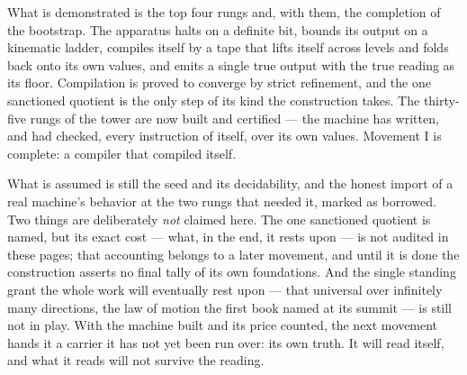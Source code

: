 What is demonstrated is the top four rungs and, with them, the completion of the bootstrap. The apparatus
halts on a definite bit, bounds its output on a kinematic ladder, compiles itself by a tape that lifts
itself across levels and folds back onto its own values, and emits a single true output with the true
reading as its floor. Compilation is proved to converge by strict refinement, and the one sanctioned
quotient is the only step of its kind the construction takes. The thirty-five rungs of the tower are now
built and certified --- the machine has written, and had checked, every instruction of itself, over its
own values. Movement I is complete: a compiler that compiled itself.

What is assumed is still the seed and its decidability, and the honest import of a real machine's behavior
at the two rungs that needed it, marked as borrowed. Two things are deliberately \emph{not} claimed here.
The one sanctioned quotient is named, but its exact cost --- what, in the end, it rests upon --- is not
audited in these pages; that accounting belongs to a later movement, and until it is done the construction
asserts no final tally of its own foundations. And the single standing grant the whole work will eventually
rest upon --- that universal over infinitely many directions, the law of motion the first book named at its
summit --- is still not in play. With the machine built and its price counted, the next movement hands it a
carrier it has not yet been run over: its own truth. It will read itself, and what it reads will not
survive the reading.
